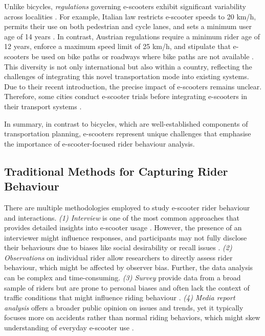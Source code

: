 Unlike bicycles, \textit{regulations} governing e-scooters exhibit significant variability across localities \cite{10.1145/3313831.3376499, NIKIFORIADIS2021102790}. For example, Italian law restricts e-scooter speeds to 20 km/h, permits their use on both pedestrian and cycle lanes, and sets a minimum user age of 14 years \cite{su142114303}.  In contrast, Austrian regulations require a minimum rider age of 12 years, enforce a maximum speed limit of 25 km/h, and stipulate that e-scooters be used on bike paths or roadways where bike paths are not available \cite{CountryOverview}. This diversity is not only international but also within a country, reflecting the challenges of integrating this novel transportation mode into existing systems. Due to their recent introduction, the precise impact of e-scooters remains unclear. Therefore, some cities conduct e-scooter trials before integrating e-scooters in their transport systems \cite{VICtrial, AusTrials}.

In summary, in contrast to bicycles, which are well-established components of transportation planning, e-scooters represent unique challenges that emphasise the importance of e-scooter-focused rider behaviour analysis.



    \subsection{Traditional Methods for Capturing Rider Behaviour}
There are multiple methodologies employed to study e-scooter rider behaviour and interactions. \textit{(1) Interview} is one of the most common approaches that provides detailed insights into e-scooter usage \cite{10.1007/978-3-030-85613-7_26,10.1145/3313831.3376499, doi:10.1080/17450101.2021.1967097}. However, the presence of an interviewer might influence responses, and participants may not fully disclose their behaviours due to biases like social desirability or recall issues \cite{ burt2023scooter}. 
\textit{(2) Observations} \cite{TUNCER2020102702, 10.1145/3313831.3376499,10.1145/3544548.3581049, 10.1145/3544548.3581045, anke2023micro} on individual rider allow researchers to directly assess rider behaviour, which might be affected by observer bias. Further, the data analysis can be complex and time-consuming. \textit{(3) Survey} \cite{LAA2020102874, GIOLDASIS2021106427, anke2023micro, WEISS2024100047} provide data from a broad sample of riders but are prone to personal biases and often lack the context of traffic conditions that might influence riding behaviour \cite{10.1145/3025453.3025911}. \textit{(4) Media report analysis} \cite{GOSSLING2020102230} offers a broader public opinion on issues and trends, yet it typically focuses more on accidents rather than normal riding behaviors, which might skew understanding of everyday e-scooter use \cite{YANG2020105608, WHITE2023182}.

